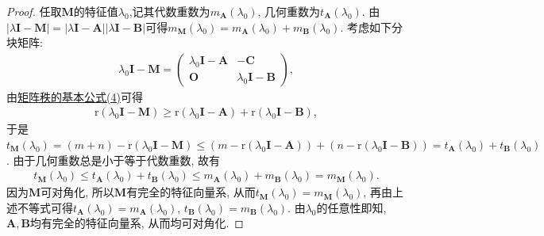 \documentclass[../../main.tex]{subfiles}%
\begin{document}
\begin{proof}
 
任取\(\boldsymbol{M}\)的特征值\(\lambda_0\),记其代数重数为\(m_{\boldsymbol{A}}(\lambda_0)\), 几何重数为\(t_{\boldsymbol{A}}(\lambda_0)\).  由\(|\lambda\boldsymbol{I}-\boldsymbol{M}| = |\lambda\boldsymbol{I} - \boldsymbol{A}||\lambda\boldsymbol{I} - \boldsymbol{B}|\)可得\(m_{\boldsymbol{M}}(\lambda_0) = m_{\boldsymbol{A}}(\lambda_0)+m_{\boldsymbol{B}}(\lambda_0)\). 考虑如下分块矩阵:
\begin{align*}
\lambda_0\boldsymbol{I} - \boldsymbol{M} = \begin{pmatrix}
\lambda_0\boldsymbol{I} - \boldsymbol{A}&-\boldsymbol{C}\\
\boldsymbol{O}&\lambda_0\boldsymbol{I} - \boldsymbol{B}
\end{pmatrix},
\end{align*}
由\hyperref[矩阵秩的基本公式4]{矩阵秩的基本公式(4)}可得
\begin{align*}
\mathrm{r}(\lambda_0\boldsymbol{I} - \boldsymbol{M})\geqslant  \mathrm{r}(\lambda_0\boldsymbol{I} - \boldsymbol{A})+\mathrm{r}(\lambda_0\boldsymbol{I} - \boldsymbol{B}),
\end{align*}
于是\(t_{\boldsymbol{M}}(\lambda_0) = (m + n) - \mathrm{r}(\lambda_0\boldsymbol{I} - \boldsymbol{M})\leqslant  (m - \mathrm{r}(\lambda_0\boldsymbol{I} - \boldsymbol{A}))+(n - \mathrm{r}(\lambda_0\boldsymbol{I} - \boldsymbol{B})) = t_{\boldsymbol{A}}(\lambda_0)+t_{\boldsymbol{B}}(\lambda_0)\). 由于几何重数总是小于等于代数重数, 故有
\begin{align*}
t_{\boldsymbol{M}}(\lambda_0)\leqslant  t_{\boldsymbol{A}}(\lambda_0)+t_{\boldsymbol{B}}(\lambda_0)\leqslant  m_{\boldsymbol{A}}(\lambda_0)+m_{\boldsymbol{B}}(\lambda_0) = m_{\boldsymbol{M}}(\lambda_0).
\end{align*}
因为\(\boldsymbol{M}\)可对角化, 所以\(\boldsymbol{M}\)有完全的特征向量系, 从而\(t_{\boldsymbol{M}}(\lambda_0) = m_{\boldsymbol{M}}(\lambda_0)\), 再由上述不等式可得\(t_{\boldsymbol{A}}(\lambda_0) = m_{\boldsymbol{A}}(\lambda_0)\), \(t_{\boldsymbol{B}}(\lambda_0) = m_{\boldsymbol{B}}(\lambda_0)\). 由\(\lambda_0\)的任意性即知, \(\boldsymbol{A},\boldsymbol{B}\)均有完全的特征向量系, 从而均可对角化. 

\end{proof}
\end{document}
